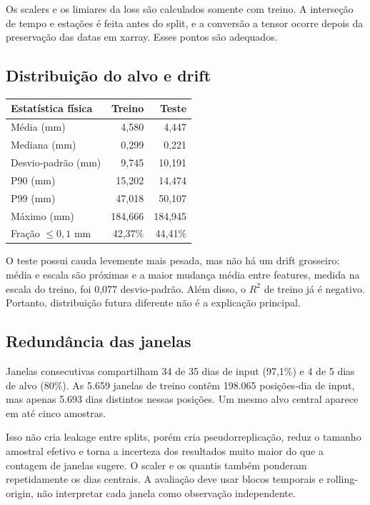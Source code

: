 \documentclass[11pt,a4paper]{article}
\begin{document}
Os scalers e os limiares da loss são calculados somente com treino. A interseção de tempo e
estações é feita antes do split, e a conversão a tensor ocorre depois da preservação das datas em
xarray. Esses pontos são adequados.

\subsection{Distribuição do alvo e drift}

\begin{center}
\begin{tabular}{@{}lrr@{}}
\toprule
\textbf{Estatística física} & \textbf{Treino} & \textbf{Teste} \\
\midrule
Média (mm) & 4,580 & 4,447 \\
Mediana (mm) & 0,299 & 0,221 \\
Desvio-padrão (mm) & 9,745 & 10,191 \\
P90 (mm) & 15,202 & 14,474 \\
P99 (mm) & 47,018 & 50,107 \\
Máximo (mm) & 184,666 & 184,945 \\
Fração $\leq0{,}1$ mm & 42,37\% & 44,41\% \\
\bottomrule
\end{tabular}
\end{center}

O teste possui cauda levemente mais pesada, mas não há um drift grosseiro: média e escala são
próximas e a maior mudança média entre features, medida na escala do treino, foi 0,077
desvio-padrão. Além disso, o $R^2$ de treino já é negativo. Portanto, distribuição futura
diferente não é a explicação principal.

\subsection{Redundância das janelas}

Janelas consecutivas compartilham 34 de 35 dias de input (97,1\%) e 4 de 5 dias de alvo
(80\%). As 5.659 janelas de treino contêm 198.065 posições-dia de input, mas apenas 5.693 dias
distintos nessas posições. Um mesmo alvo central aparece em até cinco amostras.

Isso não cria leakage entre splits, porém cria pseudorreplicação, reduz o tamanho amostral
efetivo e torna a incerteza dos resultados muito maior do que a contagem de janelas sugere. O
scaler e os quantis também ponderam repetidamente os dias centrais. A avaliação deve usar blocos
temporais e rolling-origin, não interpretar cada janela como observação independente.
\end{document}
